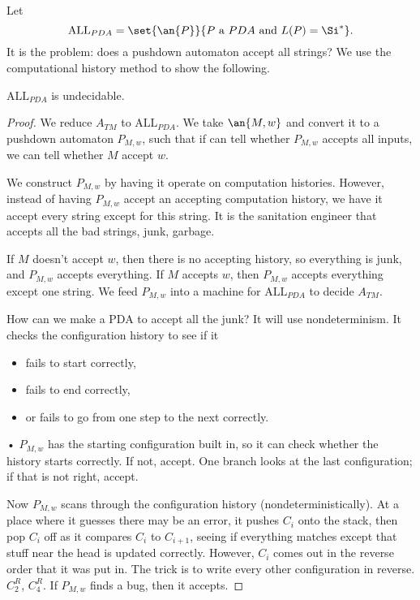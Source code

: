 Let 
\[
\text{ALL}_{PDA}=\set{
\an{P}
}{P\text{ a }PDA\text{ and }L(P)=\Si^*}.
\]
It is the problem: does a pushdown automaton accept all strings? We use the computational history method to show the following. 
\begin{thm}
$\text{ALL}_{PDA}$ is undecidable.
\end{thm}
\begin{proof}
We reduce $A_{TM}$ to $\text{ALL}_{PDA}$. We take $\an{M,w}$ and convert it to a pushdown automaton $P_{M,w}$, such that if can tell whether $P_{M,w}$ accepts all inputs, we can tell whether $M$ accept $w$. 

We construct $P_{M,w}$ by having it operate on computation histories. However, instead of having $P_{M,w}$ accept an accepting computation history, we have it accept every string except for this string. It is the sanitation engineer that accepts all the bad strings, junk, garbage. %


If $M$ doesn't accept $w$, then there is no accepting history, so everything is junk, and $P_{M,w}$ accepts everything. If $M$ accepts $w$, then $P_{M,w}$ accepts everything except one string. We feed $P_{M,w}$ into a machine for $\text{ALL}_{PDA}$ to decide $A_{TM}$.

How can we make a PDA to accept all the junk? It will use nondeterminism. It checks the configuration history to see if it 
\begin{itemize}
\item
fails to start correctly,
\item
fails to end correctly,
\item
or fails to go from one step to the next correctly.
\end{itemize}•
$P_{M,w}$ has the starting configuration built in, so it can check whether the history starts correctly. If not, accept. One branch looks at the last configuration; if that is not right, accept. 

Now $P_{M,w}$ scans through the configuration history (nondeterministically). At a place where it guesses there may be an error, it pushes $C_i$ onto the stack, then pop $C_i$ off as it compares $C_i$ to $C_{i+1}$, seeing if everything matches except that stuff near the head is updated correctly. %
However, $C_i$ comes out in the reverse order that it was put in. The trick is to write every other configuration in reverse. $C_2^R$, $C_4^R$. 
If $P_{M,w}$ finds a bug, then it accepts.
\end{proof}
